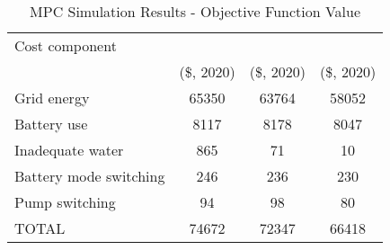 \begin{table}[!htb]
	\caption{MPC Simulation Results - Objective Function Value}
	\label{table:mpc-simulation-results}
	\centering
	\setlength\tabcolsep{0.6mm}
	\begin{tabular}{lS[table-format=5]S[table-format=5]S[table-format=5]}
		\toprule
		  Cost component
          & {} & {} & {} \\
		  & {(\$, 2020)} & {(\$, 2020)}                    & {(\$, 2020)} \\
		\midrule
		Grid energy            & 65350 & 63764 & 58052 \\
		Battery use            &  8117 &  8178 &  8047 \\
		Inadequate water       &   865 &    71 &    10 \\
		Battery mode switching &   246 &   236 &   230 \\
		Pump switching         &    94 &    98 &    80 \\
		\midrule
		TOTAL                  & 74672 & 72347 & 66418 \\
		\bottomrule
	\end{tabular}
\end{table}

